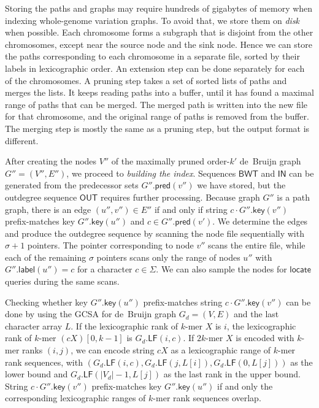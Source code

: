\documentclass[a4paper,UKenglish]{lipics-v2016}
\newcommand{\abs}[1]{\ensuremath{\lvert #1 \rvert}}
\newcommand{\LF}{\ensuremath{\mathsf{LF}}}
\newcommand{\locate}{\ensuremath{\mathsf{locate}}}
\newcommand{\glabel}{\ensuremath{\mathsf{label}}}
\newcommand{\gpred}{\ensuremath{\mathsf{pred}}}
\newcommand{\gkey}{\ensuremath{\mathsf{key}}}
\newcommand{\kmer}[1]{$#1$\nobreakdash-mer}
\newcommand{\orderk}[1]{order\nobreakdash-$#1$}
\newcommand{\BWT}{\ensuremath{\mathsf{BWT}}}
\newcommand{\bvIN}{\ensuremath{\mathsf{IN}}}
\newcommand{\bvOUT}{\ensuremath{\mathsf{OUT}}}
\begin{document}
Storing the paths and graphs may require hundreds of gigabytes of memory when indexing whole-genome variation graphs. To avoid that, we store them on \emph{disk} when possible. Each chromosome forms a subgraph that is disjoint from the other chromosomes, except near the source node and the sink node. Hence we can store the paths corresponding to each chromosome in a separate file, sorted by their labels in lexicographic order. An extension step can be done separately for each of the chromosomes. A pruning step takes a set of sorted lists of paths and merges the lists. It keeps reading paths into a buffer, until it has found a maximal range of paths that can be merged. The merged path is written into the new file for that chromosome, and the original range of paths is removed from the buffer. The merging step is mostly the same as a pruning step, but the output format is different.

After creating the nodes $V''$ of the maximally pruned \orderk{k'} de~Bruijn graph $G'' = (V'', E'')$, we proceed to \emph{building the index}. Sequences $\BWT$ and $\bvIN$ can be generated from the predecessor sets $G''.\gpred(v'')$ we have stored, but the outdegree sequence $\bvOUT$ requires further processing. Because graph $G''$ is a path graph, there is an edge $(u'', v'') \in E''$ if and only if string $c \cdot G''.\gkey(v'')$ prefix-matches key $G''.\gkey(u'')$ and $c \in G''.\gpred(v')$. We determine the edges and produce the outdegree sequence by scanning the node file sequentially with $\sigma+1$ pointers. The pointer corresponding to node $v''$ scans the entire file, while each of the remaining $\sigma$ pointers scans only the range of nodes $u''$ with $G''.\glabel(u'') = c$ for a character $c \in \Sigma$. We can also sample the nodes for $\locate$ queries during the same scans.

Checking whether key $G''.\gkey(u'')$ prefix-matches string $c \cdot G''.\gkey(v'')$ can be done by using the GCSA for de~Bruijn graph $G_{d} = (V, E)$ and the last character array $L$. If the lexicographic rank of \kmer{k} $X$ is $i$, the lexicographic rank of \kmer{k} $(cX)[0, k-1]$ is $G_{d}.\LF(i, c)$. If \kmer{2k} $X$ is encoded with \kmer{k} ranks $(i, j)$, we can encode string $cX$ as a lexicographic range of \kmer{k} rank sequences, with $(G_{d}.\LF(i, c), G_{d}.\LF(j, L[i]), G_{d}.\LF(0, L[j]))$ as the lower bound and $G_{d}.\LF(\abs{V_{d}}-1, L[j])$ as the last rank in the upper bound. String $c \cdot G''.\gkey(v'')$ prefix-matches key $G''.\gkey(u'')$ if and only the corresponding lexicographic ranges of \kmer{k} rank sequences overlap.
\end{document}
